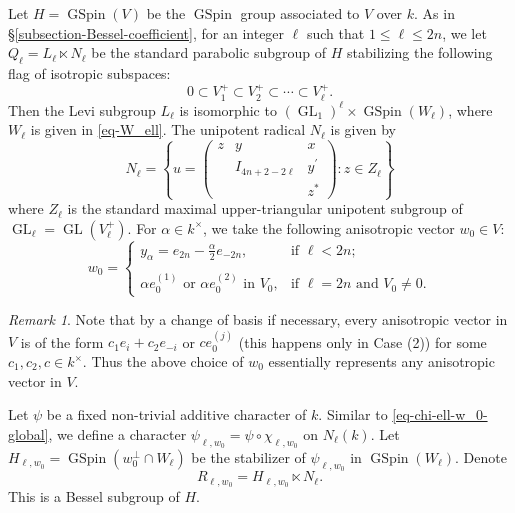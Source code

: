 \documentclass[12pt]{amsart}
\theoremstyle{remark}
\newtheorem{remark}[theorem]{Remark}%
\DeclareMathOperator{\GL}{GL}
\DeclareMathOperator{\GSpin}{GSpin}
\begin{document}
Let $H=\GSpin(V)$ be the $\GSpin$ group associated to $V$ over
$k$. As in \S\ref{subsection-Bessel-coefficient}, for an integer $\ell$ such that $1\le \ell \le 2n$, we let $Q_\ell=L_{{\ell}}\ltimes N_{{\ell}}$ be the standard parabolic subgroup of $H$ stabilizing the following flag of isotropic subspaces:
\begin{equation}\label{eq-parobolic-Ql-flag}
0\subset V_1^+ \subset V_2^+ \subset \cdots \subset 	V_{\ell}^+.
\end{equation}
Then the Levi subgroup $L_{\ell}$ is isomorphic to $(\GL_1)^\ell \times \GSpin(W_\ell)$, where $W_{\ell}$ is given in \eqref{eq-W_ell}. 
The unipotent radical $N_{\ell}$ is given by 
\begin{equation*}
N_{\ell} = 	\left\{ u=\begin{pmatrix} z & y &x\\ &I_{4n+2-2\ell} &y^\prime\\ &&z^*\end{pmatrix}: z\in Z_{\ell} \right\}
\end{equation*}
where $Z_{\ell}$ is the standard maximal upper-triangular unipotent subgroup of $\GL_{\ell}=\GL(V_{\ell}^+)$. 
For $\alpha\in k^\times$, we take the following anisotropic vector $w_0\in V$:
\begin{equation}\label{eq-w_0-local}
w_0=\begin{cases}
     y_\alpha=e_{2n}-\frac{\alpha}{2}e_{-2n}, & \text{if $\ell < 2n$};\\
     &\\
     \text{$\alpha e_0^{(1)}$ or $\alpha e_0^{(2)}$ in $V_0$}, & \text{if $\ell=2n$ and $V_0\neq 0$}.
    \end{cases}
\end{equation}

\begin{remark}\label{remark-w_0-local}
Note that by a change of basis if necessary, every anisotropic vector in $V$ is of the form $c_1 e_i+c_2 e_{-i}$ or $c e_0^{(j)}$ (this happens only in Case (2)) for some $c_1, c_2, c\in k^\times$. Thus the above choice of $w_0$ essentially represents any anisotropic vector in $V$.  	
\end{remark}

Let $\psi$ be a fixed non-trivial additive character of $k$. Similar to \eqref{eq-chi-ell-w_0-global}, we define a character $\psi_{\ell, w_0}=\psi\circ \chi_{\ell, w_0}$ on $N_{\ell}(k)$. Let $H_{\ell,w_0}=\GSpin(w_0^\perp\cap W_{\ell})$ be the stabilizer of $\psi_{\ell, w_0}$ in $\GSpin(W_{\ell})$. Denote
\begin{equation}
\label{eq-R_l,w0}
R_{\ell, w_0}=H_{\ell, w_0}\ltimes N_{\ell}.	
\end{equation}
This is a Bessel subgroup of $H$.
\end{document}
